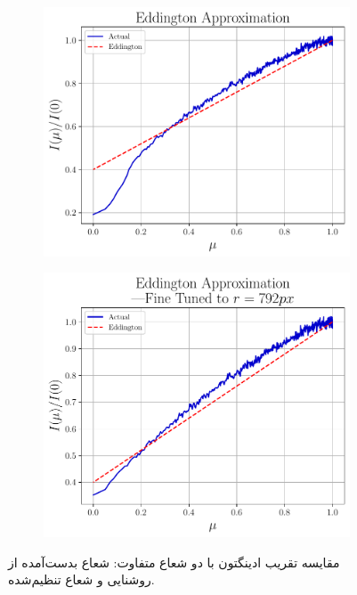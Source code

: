 \documentclass[12pt,a4paper]{article}
\begin{document}
	\begin{figure}
		\centering
		\begin{subfigure}{0.49\linewidth}
			\centering
			\includegraphics[width=\linewidth]{../fig/eddington}
		\end{subfigure}
		\begin{subfigure}{0.49\linewidth}
			\centering
			\includegraphics[width=\linewidth]{../fig/eddington-modified}
		\end{subfigure}
		\caption{مقایسه تقریب ادینگتون با دو شعاع متفاوت: شعاع بدست‌آمده از روشنایی و شعاع تنظیم‌شده.}
	\end{figure}
	
\end{document}
